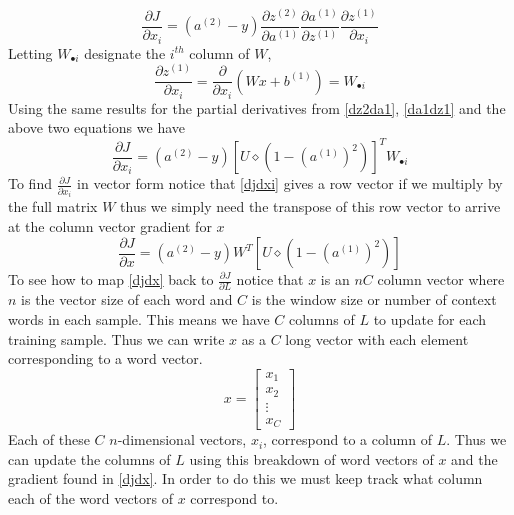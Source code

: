 \documentclass{article}
\begin{document}
\begin{equation}
\frac{\partial J}{\partial x_{i}} = \left(a^{(2)} - y\right)\frac{\partial z^{(2)}}{\partial a^{(1)}}\frac{\partial a^{(1)}}{\partial z^{(1)}}\frac{\partial z^{(1)}}{\partial x_{i}}
\end{equation}
Letting \( W_{\bullet i} \) designate the \(i^{th}\) column of \(W\),
\begin{equation}
\frac{\partial z^{(1)}}{\partial x_i} = \frac{\partial}{\partial x_i} \left( Wx+b^{(1)}\right) = W_{\bullet i}
\end{equation}
Using the same results for the partial derivatives from \eqref{dz2da1}, \eqref{da1dz1} and the above two equations we have
\begin{equation}\label{djdxi}
\frac{\partial J}{\partial x_i} = \left(a^{(2)} - y\right) \left[U \diamond\left( 1-(a^{(1)})^2 \right)\right]^T W_{\bullet i}
\end{equation}
To find \(\frac{\partial J}{\partial x_i}\) in vector form notice that \eqref{djdxi} gives a row vector if we multiply by the full matrix \(W\) thus we simply need the transpose of this row vector to arrive at the column vector gradient for \(x\)
\begin{equation}\label{djdx}
\frac{\partial J}{\partial x} = \left(a^{(2)} - y\right) W^T \left[ U \diamond\left( 1-(a^{(1)})^2 \right)\right]
\end{equation}
To see how to map \eqref{djdx} back to \( \frac{\partial J}{\partial L}\) notice that \(x\) is an \( nC\) column vector where \(n\) is the vector size of each word and \(C\) is the window size or number of context words in each sample.  This means we have \(C\) columns of \( L \) to update for each training sample.  Thus we can write \(x\) as a \(C\) long vector with each element corresponding to a word vector.
\begin{displaymath}
x = \begin{bmatrix}  x_{1}\\  x_{2} \\ \vdots \\ x_{C}\end{bmatrix}
\end{displaymath}
Each of these \(C\)  \(n\)-dimensional vectors, \(x_{i} \), correspond to a column of \(L\).  Thus we can update the columns of \(L\) using this breakdown of word vectors of \(x\) and the gradient found in \eqref{djdx}.  In order to do this we must keep track what column each of the word vectors of \(x\) correspond to.
\end{document}

